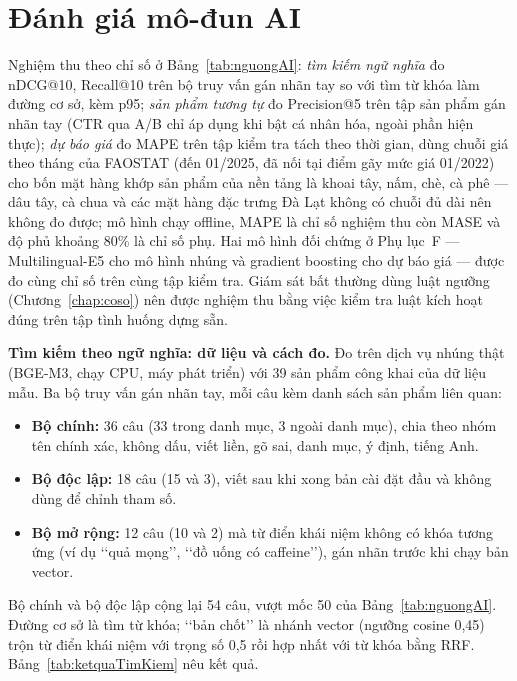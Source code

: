 
\section{Đánh giá mô-đun AI}
\label{sec:danhgiaAI}

Nghiệm thu theo chỉ số ở Bảng~\ref{tab:nguongAI}: \emph{tìm kiếm ngữ nghĩa} đo nDCG@10, Recall@10 trên bộ truy vấn gán nhãn tay so với tìm từ khóa làm đường cơ sở, kèm p95; \emph{sản phẩm tương tự} đo Precision@5 trên tập sản phẩm gán nhãn tay (CTR qua A/B chỉ áp dụng khi bật cá nhân hóa, ngoài phần hiện thực); \emph{dự báo giá} đo MAPE trên tập kiểm tra tách theo thời gian, dùng chuỗi giá theo tháng của FAOSTAT (đến 01/2025, đã nối tại điểm gãy mức giá 01/2022) cho bốn mặt hàng khớp sản phẩm của nền tảng là khoai tây, nấm, chè, cà phê --- dâu tây, cà chua và các mặt hàng đặc trưng Đà Lạt không có chuỗi đủ dài nên không đo được; mô hình chạy offline, MAPE là chỉ số nghiệm thu còn MASE và độ phủ khoảng 80\% là chỉ số phụ. Hai mô hình đối chứng ở Phụ lục~F --- Multilingual-E5 cho mô hình nhúng và gradient boosting cho dự báo giá --- được đo cùng chỉ số trên cùng tập kiểm tra. Giám sát bất thường dùng luật ngưỡng (Chương~\ref{chap:coso}) nên được nghiệm thu bằng việc kiểm tra luật kích hoạt đúng trên tập tình huống dựng sẵn.

\noindent\textbf{Tìm kiếm theo ngữ nghĩa: dữ liệu và cách đo.} Đo trên dịch vụ nhúng thật (BGE-M3, chạy CPU, máy phát triển) với 39 sản phẩm công khai của dữ liệu mẫu. Ba bộ truy vấn gán nhãn tay, mỗi câu kèm danh sách sản phẩm liên quan:
\begin{itemize}
    \item \textbf{Bộ chính:} 36 câu (33 trong danh mục, 3 ngoài danh mục), chia theo nhóm tên chính xác, không dấu, viết liền, gõ sai, danh mục, ý định, tiếng Anh.
    \item \textbf{Bộ độc lập:} 18 câu (15 và 3), viết sau khi xong bản cài đặt đầu và không dùng để chỉnh tham số.
    \item \textbf{Bộ mở rộng:} 12 câu (10 và 2) mà từ điển khái niệm không có khóa tương ứng (ví dụ \lq\lq quả mọng\rq\rq, \lq\lq đồ uống có caffeine\rq\rq), gán nhãn trước khi chạy bản vector.
\end{itemize}
Bộ chính và bộ độc lập cộng lại 54 câu, vượt mốc 50 của Bảng~\ref{tab:nguongAI}. Đường cơ sở là tìm từ khóa; \lq\lq bản chốt\rq\rq{} là nhánh vector (ngưỡng cosine 0,45) trộn từ điển khái niệm với trọng số 0,5 rồi hợp nhất với từ khóa bằng RRF. Bảng~\ref{tab:ketquaTimKiem} nêu kết quả.

